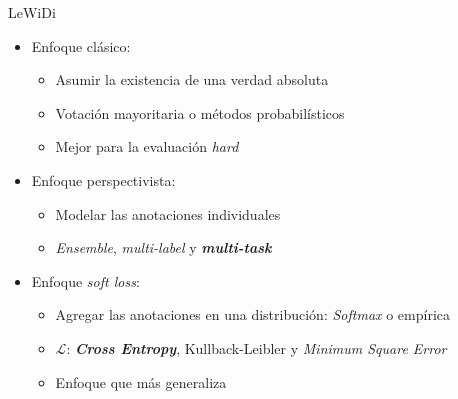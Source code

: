 \begin{frame}{LeWiDi}
\begin{itemize}
    \item Enfoque cl\'asico: 
    \begin{itemize}
        \item Asumir la existencia de una verdad absoluta
        \item Votaci\'on mayoritaria o m\'etodos probabil\'isticos
        \item Mejor para la evaluaci\'on \textit{hard}
    \end{itemize}
    \item Enfoque perspectivista:
    \begin{itemize}
        \item Modelar las anotaciones individuales
        \item \textit{Ensemble}, \textit{multi-label} y \textbf{\textit{multi-task}}
    \end{itemize}
    \item Enfoque \textit{soft loss}: 
    \begin{itemize}
        \item Agregar las anotaciones en una distribuci\'on: \textit{Softmax} o emp\'irica 
        \item $\mathcal{L}$: \textbf{\textit{Cross Entropy}}, Kullback-Leibler y \textit{Minimum Square Error}
        \item Enfoque que m\'as generaliza
    \end{itemize}
\end{itemize}
\end{frame}

